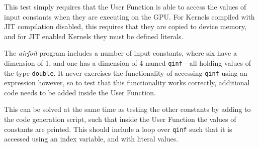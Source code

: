 This test simply requires that the User Function is able to access the values of input constants when they are executing on the GPU. For Kernels compiled with JIT compilation disabled, this requires that they are copied to device memory, and for JIT enabled Kernels they must be defined literals.
\par
The \textit{airfoil} program includes a number of input constants, where six have a dimension of 1, and one has a dimension of 4 named \verb|qinf| - all holding values of the type \verb|double|. It never exercises the functionality of accessing \verb|qinf| using an expression however, so to test that this functionality works correctly, additional code needs to be added inside the User Function.
\par This can be solved at the same time as testing the other constants by adding to the code generation script, such that inside the User Function the values of constants are printed. This should include a loop over \verb|qinf| such that it is accessed using an index variable, and with literal values.

